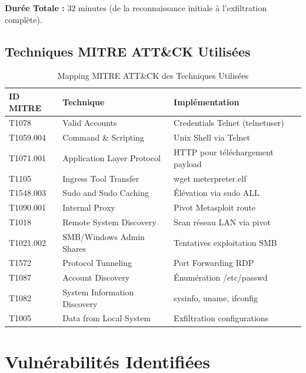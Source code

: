 \documentclass[12pt,a4paper,openany]{report}
\newcommand{\tableheadcolor}{\rowcolor{tableheadbg}}
\begin{document}
	\textbf{Durée Totale :} 32 minutes (de la reconnaissance initiale à l'exfiltration complète).
	
	\subsection{Techniques MITRE ATT\&CK Utilisées}
	
	\begin{table}[H]
		\centering
		\small
		\renewcommand{\arraystretch}{1.3}
		\setlength{\arrayrulewidth}{0.5pt}
		\begin{tabular}{>{\ttfamily}p{3cm} p{4.5cm} p{5cm}}
			\arrayrulecolor{tableborder}
			\hline
			\tableheadcolor
			\textcolor{tableheadfg}{\textbf{ID MITRE}} &
			\textcolor{tableheadfg}{\textbf{Technique}} &
			\textcolor{tableheadfg}{\textbf{Implémentation}} \\
			\hline
			\rowcolor{tablerowalt}
			T1078 & Valid Accounts & Credentials Telnet (telnetuser) \\
			T1059.004 & Command \& Scripting & Unix Shell via Telnet \\
			\rowcolor{tablerowalt}
			T1071.001 & Application Layer Protocol & HTTP pour téléchargement payload \\
			T1105 & Ingress Tool Transfer & wget meterpreter.elf \\
			\rowcolor{tablerowalt}
			T1548.003 & Sudo and Sudo Caching & Élévation via sudo ALL \\
			T1090.001 & Internal Proxy & Pivot Metasploit route \\
			\rowcolor{tablerowalt}
			T1018 & Remote System Discovery & Scan réseau LAN via pivot \\
			T1021.002 & SMB/Windows Admin Shares & Tentatives exploitation SMB \\
			\rowcolor{tablerowalt}
			T1572 & Protocol Tunneling & Port Forwarding RDP \\
			T1087 & Account Discovery & Énumération /etc/passwd \\
			\rowcolor{tablerowalt}
			T1082 & System Information Discovery & sysinfo, uname, ifconfig \\
			T1005 & Data from Local System & Exfiltration configurations \\
			\hline
		\end{tabular}
		\caption{Mapping MITRE ATT\&CK des Techniques Utilisées}
		\label{tab:mitre-attack}
	\end{table}
	
	\section{Vulnérabilités Identifiées}
	
\end{document}
